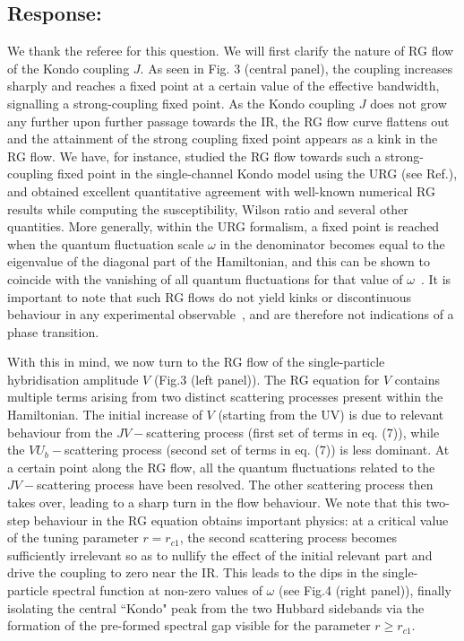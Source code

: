\documentclass{article}
\newcommand{\response}[1]{{\color{blue}\subsection*{Response:}{#1}\vspace*{10pt}}}
\begin{document}
\response{
	We thank the referee for this question. We will first clarify the nature of RG flow of the Kondo coupling \(J\). As seen in Fig. 3 (central panel), the coupling increases sharply and reaches a fixed point at a certain value of the effective bandwidth, signalling a strong-coupling fixed point. As the Kondo coupling $J$ does not grow any further upon further passage towards the IR, the RG flow curve flattens out and the attainment of the strong coupling fixed point appears as a kink in the RG flow. We have, for instance, studied the RG flow towards such a strong-coupling fixed point in the single-channel Kondo model using the URG (see Ref.\cite{anirban_kondo}), and obtained excellent quantitative agreement with well-known numerical RG results while computing the susceptibility, Wilson ratio and several other quantities. More generally, within the URG formalism, a fixed point is reached when the quantum fluctuation scale \(\omega\) in the denominator becomes equal to the eigenvalue of the diagonal part of the Hamiltonian, and this can be shown to coincide with the vanishing of all quantum fluctuations for that value of \(\omega\)~\cite{anirbanurg1}. It is important to note that such RG flows do not yield kinks or discontinuous behaviour in any experimental observable~\cite{anirban_kondo}, and are therefore not indications of a phase transition.\\[10pt]
\par
With this in mind, we now turn to the RG flow of the single-particle hybridisation amplitude \(V\) (Fig.3 (left panel)). The RG equation for \(V\) contains multiple terms arising from two distinct scattering processes present within the Hamiltonian. The initial increase of \(V\) (starting from the UV) is due to relevant behaviour from the \(JV-\)scattering process (first set of terms in eq. (7)), while the \(VU_b-\)scattering process (second set of terms in eq. (7)) is less dominant. At a certain point along the RG flow, all the quantum fluctuations related to the \(JV-\)scattering process have been resolved. The other scattering process then takes over, leading to a sharp turn in the flow behaviour. We note that this two-step behaviour in the RG equation obtains important physics:
at a critical value of the tuning parameter \(r = r_{c1}\), the second scattering process becomes sufficiently irrelevant so as to nullify the effect of the initial relevant part and drive the coupling to zero near the IR. This leads to the dips in the single-particle spectral function at non-zero values of $\omega$ (see Fig.4 (right panel)), finally isolating the central ``Kondo" peak from the two Hubbard sidebands via the formation of the pre-formed spectral gap visible for the parameter $r\geq r_{c1}$.
}
\end{document}
